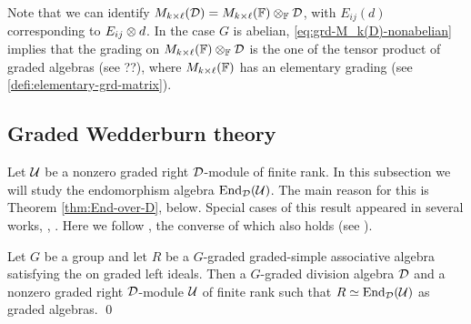 \begin{remark}\label{rmk:M_k(F)-tensor-D}
    Note that we can identify $M_{k \times \ell}(\mathcal{D}) = M_{k \times \ell}(\mathbb{F}) \otimes_{\mathbb{F}} \mathcal{D}$,     with $E_{ij}(d)$ corresponding to $E_{ij}\otimes d$. 
    In the case $G$ is abelian, \cref{eq:grd-M_k(D)-nonabelian} implies that the grading on $M_{k\times \ell}(\mathbb{F}) \otimes_{\mathbb{F}} \mathcal{D}$ is the one of the tensor product of graded algebras (see ??), where $M_{k\times \ell}(\mathbb{F})$ has an elementary grading (see \cref{defi:elementary-grd-matrix}).
\end{remark}



\subsection{Graded Wedderburn theory}\label{ssec:Grd-Wedderburn-Theory}

Let $\mathcal U$ be a nonzero graded right $\mathcal{D}$-module of finite rank. 
In this subsection we will study the endomorphism algebra $\operatorname{End}_{\mathcal{D}} (\mathcal U)$. 
The main reason for this is Theorem \ref{thm:End-over-D}, below. 
Special cases of this result appeared in several works, \eg, \cite{BSZ01,MR2046303,BZ02}. 
Here we follow \cite[Theorem 2.6]{livromicha}, the converse of which also holds (see \cite[page 31]{livromicha}).

\begin{thm}\label{thm:End-over-D}
	Let $G$ be a group and let $R$ be a $G$-graded graded-simple associative algebra satisfying the \dcc on graded left ideals. 
	Then a $G$-graded division algebra $\mathcal{D}$ and a nonzero graded right $\mathcal{D}$-module $\mathcal U$ of finite rank such that $R \simeq \operatorname{End}_{\mathcal{D}} (\mathcal U)$ as graded algebras. \qed
\end{thm}

